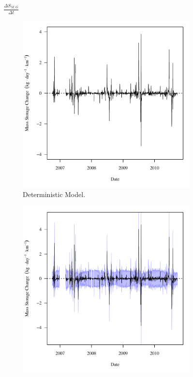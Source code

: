 \begin{linenumbers}
\subfiguremid
\begin{landscape}
	\begin{figure}
		$ \displaystyle \frac{\Delta S_{M,G}}{\Delta t} $
		\begin{subfigure}{0.7\textwidth}
			\centering
			\includegraphics[width=\tableCustomSize]{"Figures/Results_DSR/Deterministic/f Segment G"}
			\caption{Deterministic Model.}
		\end{subfigure}%
		\begin{subfigure}{0.7\textwidth}
			\centering
			\includegraphics[width=\tableCustomSize]{"Figures/Results_DSR/Stochastic/f Segment G"}

\end{subfigure}
\end{figure}
\end{landscape}
\end{linenumbers}
